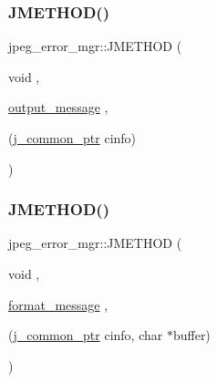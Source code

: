 \mbox{\label{structjpeg__error__mgr_ac2989f8ef34acdd78ce26a9110a1c094}} 
\subsubsection{\texorpdfstring{JMETHOD()}{JMETHOD()}\hspace{0.1cm}{\footnotesize\ttfamily [3/5]}}
{\footnotesize\ttfamily jpeg\+\_\+error\+\_\+mgr\+::\+J\+M\+E\+T\+H\+OD (\begin{DoxyParamCaption}\item[{void}]{,  }\item[{\mbox{\hyperlink{jerror_8c_ac726e73416c0b5394af1a4275dd61346}{output\+\_\+message}}}]{,  }\item[{(\mbox{\hyperlink{jpeglib_8h_a1a177ab705cefea8f30ec31a48e62650}{j\+\_\+common\+\_\+ptr}} cinfo)}]{ }\end{DoxyParamCaption})}

\mbox{\label{structjpeg__error__mgr_a5f1dfb51c337c36ae1bc5fae7f84528f}} 
\subsubsection{\texorpdfstring{JMETHOD()}{JMETHOD()}\hspace{0.1cm}{\footnotesize\ttfamily [4/5]}}
{\footnotesize\ttfamily jpeg\+\_\+error\+\_\+mgr\+::\+J\+M\+E\+T\+H\+OD (\begin{DoxyParamCaption}\item[{void}]{,  }\item[{\mbox{\hyperlink{jerror_8c_a67e2834aaaecd3d95b274bf47f96cd2a}{format\+\_\+message}}}]{,  }\item[{(\mbox{\hyperlink{jpeglib_8h_a1a177ab705cefea8f30ec31a48e62650}{j\+\_\+common\+\_\+ptr}} cinfo, char $\ast$buffer)}]{ }\end{DoxyParamCaption})}

\mbox{\label{structjpeg__error__mgr_ac676478083167b3731995d7901bd4b6c}} 
